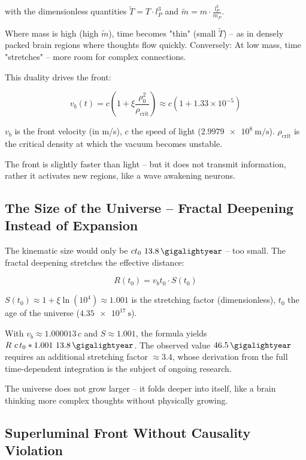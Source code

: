 with the dimensionless quantities $\tilde{T} = T \cdot l_P^3$ and $\tilde{m} = m \cdot \frac{l_P^3}{m_P}$.

Where mass is high (high $\tilde{m}$), time becomes "thin" (small $\tilde{T}$) -- as in densely packed brain regions where thoughts flow quickly. Conversely: At low mass, time "stretches" -- more room for complex connections.

This duality drives the front:

\begin{equation}
v_b(t) = c \left( 1 + \xi \frac{\rho_0^2}{\rho_{\text{crit}}} \right) \approx c \left(1 + 1.33 \times 10^{-5}\right)
\end{equation}

$v_b$ is the front velocity (in m/s), $c$ the speed of light ($\SI{2.9979e8}{\meter\per\second}$). $\rho_{\text{crit}}$ is the critical density at which the vacuum becomes unstable.

The front is slightly faster than light -- but it does not transmit information, rather it activates new regions, like a wave awakening neurons.

\subsection*{The Size of the Universe -- Fractal Deepening Instead of Expansion}

The kinematic size would only be $c t_0 \approx \SI{13.8}{\gigalightyear}$ -- too small. The fractal deepening stretches the effective distance:

\begin{equation}
R(t_0) = v_b t_0 \cdot S(t_0)
\end{equation}

$S(t_0) \approx 1 + \xi \ln(10^4) \approx 1.001$ is the stretching factor (dimensionless), $t_0$ the age of the universe ($\SI{4.35e17}{\second}$).

With $v_b \approx 1.000013\,c$ and $S \approx 1.001$, the formula yields $R \approx c\,t_0 \cdot 1.001 \approx \SI{13.8}{\gigalightyear}$. The observed value $\SI{46.5}{\gigalightyear}$ requires an additional stretching factor $\approx 3.4$, whose derivation from the full time-dependent integration is the subject of ongoing research.

The universe does not grow larger -- it folds deeper into itself, like a brain thinking more complex thoughts without physically growing.

\subsection*{Superluminal Front Without Causality Violation}


